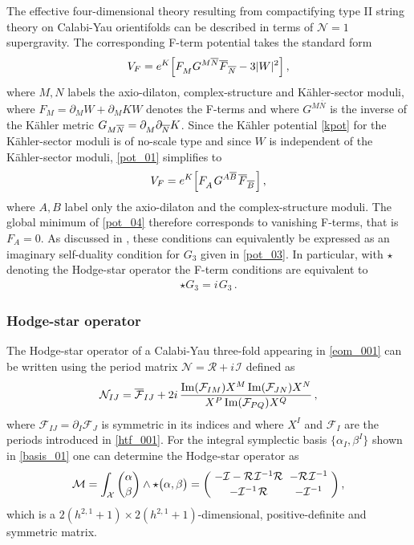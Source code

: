 \documentclass[12pt,a4paper]{article}
\newcommand{\eq}[1]{\begin{equation}
                     \begin{split} #1 \end{split}
                     \end{equation}}
\newcommand{\ov}{\overline}
\newcommand{\op}{\hspace{1pt}}
\numberwithin{equation}{section}
\begin{document}
The effective four-dimensional theory resulting from compactifying type II string theory on 
Calabi-Yau orientifolds can be 
described in terms of $\mathcal N=1$ supergravity. 
The corresponding  F-term potential takes the standard form
\eq{
  \label{pot_01}
 V_F = e^K \Bigl[ F_{M\vphantom{\ov N}} G^{M\ov N} \ov F_{\ov N} - 3\lvert W\rvert^2 \Bigr] \,,
}
where $M,N$ labels the axio-dilaton, complex-structure and K\"ahler-sector moduli, 
where $F_M = \partial_M W + \partial_M K W$ denotes the F-terms and where $G^{M\ov N}$ is the inverse of 
the K\"ahler metric $G_{M\ov N} = \partial_{M\vphantom{\ov N}} \partial_{\ov N} K$.
Since the K\"ahler potential \eqref{kpot} for the K\"ahler-sector  moduli is of no-scale type and since 
$W$ is independent of the K\"ahler-sector moduli, 
\eqref{pot_01} simplifies to
\eq{
\label{pot_04}
 V_F = e^K \Bigl[ F_{A\vphantom{\ov B}}\op G^{A\ov B}\op \ov F_{\ov B}\op \Bigr]\,,
}
where $A,B$ label only the axio-dilaton and the complex-structure moduli. The global minimum of \eqref{pot_04}
therefore corresponds to vanishing F-terms, that is
$F_{A} = 0$.
As discussed  in \cite{Giddings:2001yu}, these conditions can equivalently be expressed as an imaginary
self-duality condition for $G_3$ given in \eqref{pot_03}. In particular, with $\star$ denoting the Hodge-star operator 
the F-term conditions
are equivalent to 
\eq{
  \label{eom_001}
  \star G_3 = i \op G_3 \,.
}




\subsubsection*{Hodge-star operator}


The Hodge-star operator of a Calabi-Yau three-fold appearing in \eqref{eom_001}
can be written using 
the period matrix $\mathcal N = \mathcal R + i\op \mathcal I$  defined as 
\eq{
\label{pm}
{\cal N}_{IJ}=\overline{\mathcal {F}}_{IJ}+2i \, \frac{
{\rm Im}(\mathcal F_{IM}) X^M \, {\rm Im}(\mathcal F_{JN}) X^N}{
           X^P \,{\rm Im}(\mathcal F_{PQ}) X^Q}  \,,
}
where $\mathcal F_{IJ} = \partial_I \mathcal F_J$ is symmetric in its indices 
and where 
$X^I$ and $\mathcal F_I$ are the periods introduced in \eqref{htf_001}. 
For the integral symplectic basis  $\{\alpha_I,\beta^I\}$ shown in 
\eqref{basis_01}
one can  determine the Hodge-star operator as
\eq{
\label{mat_197}
   \mathcal M = \int_{\mathcal X} \binom{\alpha}{\beta} \wedge \star \bigl(\alpha,\beta\bigr) 
  =
   \arraycolsep3pt
   \left( \begin{array}{cc}
   -\mathcal I - \mathcal R\op \mathcal I^{-1} \mathcal R
   &
  - \mathcal R\op \mathcal I^{-1} 
  \\[2pt]
  - \mathcal I^{-1}\op \mathcal R & - \mathcal I^{-1} 
  \end{array}\right) ,
}
which is a  $2(h^{2,1}+1)\times 2(h^{2,1}+1)$-dimensional, positive-definite and symmetric
matrix.
\end{document}
